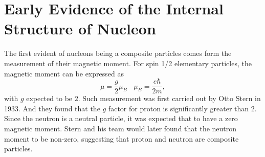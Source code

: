 \section {Early Evidence of the Internal Structure of Nucleon}
The first evident of nucleons being a composite particles comes form the 
measurement of their magnetic moment. For spin 1/2 elementary particles, the 
magnetic moment can be expressed as 
\begin{equation}
\mu = \frac{g}{2}\mu_B ~~~~ \mu_B = \frac{e\hbar}{2m},
\end{equation}
with $g$ expected to be $2$. Such measurement was first carried out by Otto 
Stern in 1933. And they found that the $g$ factor for proton is significantly 
greater than $2$. Since the neutron is a neutral particle, it was expected that
to have a zero magnetic moment. Stern and his team would later found that the 
neutron moment to be non-zero, suggesting that proton and neutron are composite
particles.

